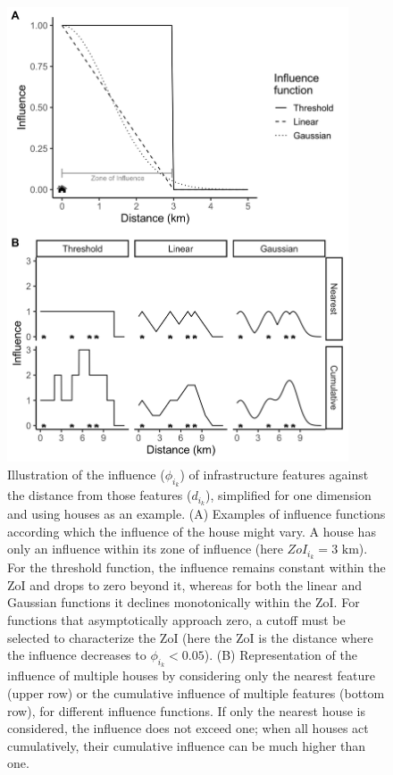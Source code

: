 \documentclass[titlepage]{article}
\begin{document}
\begin{figure}[h]
\centering
\includegraphics[width=0.9\textwidth]{figures/ZoI_conceptual.png}
\caption{\label{fig:zoi_conceptual} Illustration of the influence ($\phi_{i_k}$) of infrastructure features against the distance from those features ($d_{i_k}$), simplified for one dimension and using houses as an example. (A) Examples of influence functions according which the influence of the house might vary. A house has only an influence within its zone of influence (here $ZoI_{i_k} = 3 \text{ km}$). For the threshold function, the influence remains constant within the ZoI and drops to zero beyond it, whereas for both the linear and Gaussian functions it declines monotonically within the ZoI. For functions that asymptotically approach zero, a cutoff must be selected to characterize the ZoI (here the ZoI is the distance where the influence decreases to $\phi_{i_k} < 0.05$). (B) Representation of the influence of multiple houses by considering only the nearest feature (upper row) or the cumulative influence of multiple features (bottom row), for different influence functions. If only the nearest house is considered, the influence does not exceed one; when all houses act cumulatively, their cumulative influence can be much higher than one.}
\end{figure}
\end{document}
